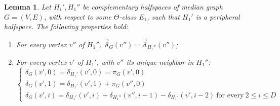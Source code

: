 \documentclass[11pt,letterpaper]{article}
\newtheorem{lemma}{Lemma}
\begin{document}
\begin{lemma}
    Let $H_1',H_1''$ be complementary halfspaces of median graph $G=(V,E)$, with respect to some $\Theta$-class $E_1$, such that $H_1'$ is a peripheral halfspace.
    The following properties hold:
    \begin{enumerate}
        \item For every vertex $v''$ of $H_1''$, $\overrightarrow{\delta}_G(v'') = \overrightarrow{\delta}_{H_1''}(v'')$;
        \item For every vertex $v'$ of $H_1'$, with $v''$ its unique neighbor in $H_1''$:
        $$\begin{cases}
            \delta_G(v',0) = \delta_{H_1'}(v',0) = \pi_G(v',0) \\
            \delta_G(v',1) = \delta_{H_1'}(v',1) + \pi_G(v'',0) \\
            \delta_G(v',i) = \delta_{H_1'}(v',i) + \delta_{H_1''}(v'',i-1) - \delta_{H_1'}(v',i-2) \ \text{for every} \ 2 \le i \le D
        \end{cases}$$
    \end{enumerate}
\end{lemma}
\end{document}
